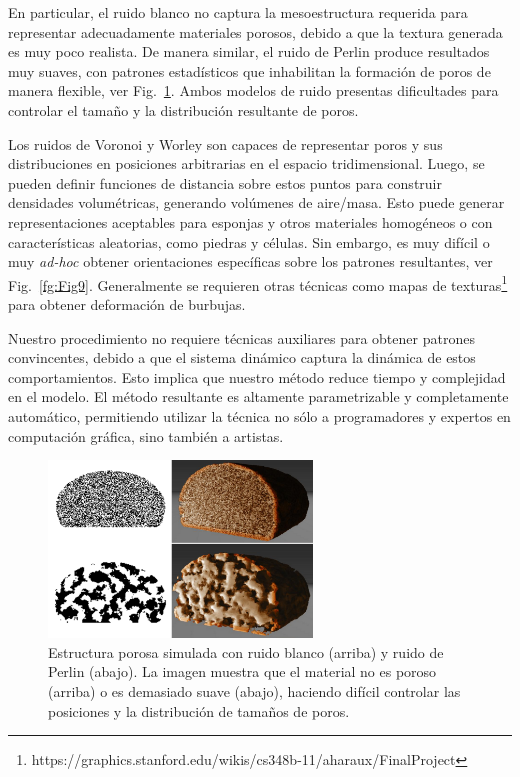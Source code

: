 En particular, el ruido blanco no captura la mesoestructura requerida para representar adecuadamente materiales porosos, debido a que la textura generada es muy poco realista.
De manera similar, el ruido de Perlin produce resultados muy suaves, con patrones estadísticos que inhabilitan la formación de poros de manera flexible, ver Fig.~\ref{fg:Fig8}.
Ambos modelos de ruido presentas dificultades para controlar el tamaño y la distribución resultante de poros.

Los ruidos de Voronoi y Worley son capaces de representar poros y sus distribuciones en posiciones arbitrarias en el espacio tridimensional.
Luego, se pueden definir funciones de distancia sobre estos puntos para construir densidades volumétricas, generando volúmenes de aire/masa.
Esto puede generar representaciones aceptables para esponjas y otros materiales homogéneos o con características aleatorias, como piedras y células.
Sin embargo, es muy difícil o muy {\em ad-hoc} obtener orientaciones específicas sobre los patrones resultantes, ver Fig.~\ref{fg:Fig9}.
Generalmente se requieren otras técnicas como mapas de texturas\footnote{https://graphics.stanford.edu/wikis/cs348b-11/aharaux/FinalProject} para obtener deformación de burbujas.

Nuestro procedimiento no requiere técnicas auxiliares para obtener patrones convincentes, debido a que el sistema dinámico captura la dinámica de estos comportamientos.
Esto implica que nuestro método reduce tiempo y complejidad en el modelo.
El método resultante es altamente parametrizable y completamente automático, permitiendo utilizar la técnica no sólo a programadores y expertos en computación gráfica, sino también a artistas.


\begin{figure}
  \centerline{\includegraphics[width=7cm]{figures/Fig8}}
  \caption[Estructura porosa simulada con ruido blanco y ruido de Perlin]{Estructura porosa simulada con ruido blanco (arriba) y ruido de Perlin (abajo). La imagen muestra que el material no es poroso (arriba) o es demasiado suave (abajo), haciendo difícil controlar las posiciones y la distribución de tamaños de poros.}
  \label{fg:Fig8}
\end{figure}

